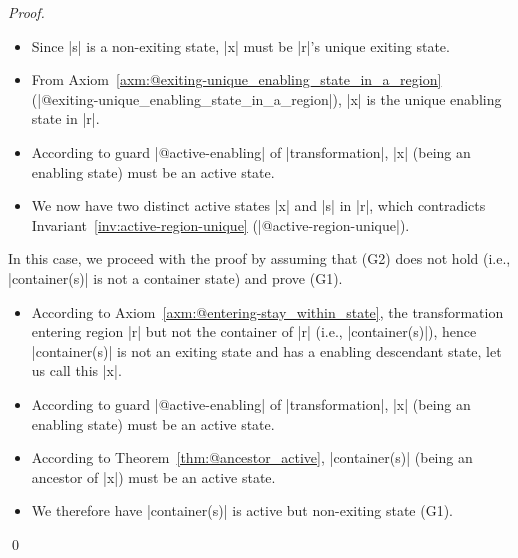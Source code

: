 \begin{proof}
\begin{case}
\begin{itemize}
\begin{itemize}
\begin{itemize}
\begin{itemize}
                    \item Since |s| is a non-exiting state, |x| must be |r|'s unique exiting state.

                    \item From Axiom~\ref{axm:@exiting-unique_enabling_state_in_a_region} (|@exiting-unique_enabling_state_in_a_region|), |x| is the unique enabling state in |r|.

                    \item According to guard |@active-enabling| of |transformation|, |x| (being an enabling state) must be an active state.

                    \item We now have two distinct active states |x| and |s| in |r|, which contradicts Invariant~\ref{inv:active-region-unique} (|@active-region-unique|).
                \end{itemize}
            \end{itemize}
        \end{itemize}
    \end{itemize}
\end{case}

\begin{case}
\label{container_active:case2}
In this case, we proceed with the proof by assuming that (G2) does not hold (i.e., |container(s)| is not a container state) and prove (G1).  
\begin{itemize}
    \item According to Axiom~\ref{axm:@entering-stay_within_state}, the transformation entering region |r| but not the container of |r| (i.e., |container(s)|), hence |container(s)| is not an exiting state and has a enabling descendant state, let us call this |x|.

    \item According to guard |@active-enabling| of |transformation|, |x| (being an enabling state) must be an active state.
    
    \item According to Theorem~\ref{thm:@ancestor_active}, |container(s)| (being an ancestor of |x|) must be an active state. 

    \item We therefore have |container(s)| is active but non-exiting state (G1).    
\end{itemize}
\end{case}
\qed
\end{proof}
        

